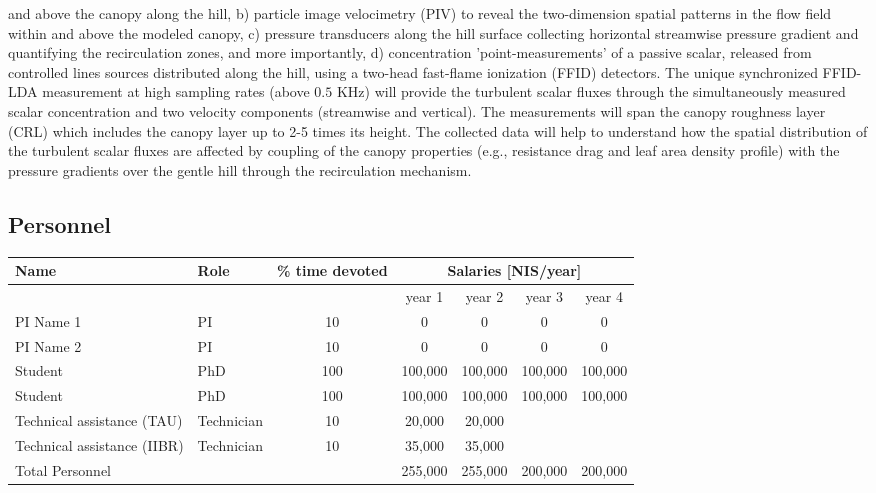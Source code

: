 \documentclass[a4paper,12pt]{report}
\begin{document}
and above the canopy along the hill, b) particle image velocimetry (PIV) to reveal the two-dimension spatial patterns in the flow field within and above the modeled canopy, c) pressure transducers along the hill surface collecting horizontal streamwise pressure gradient and quantifying the recirculation zones, and more importantly, d) concentration 'point-measurements' of a passive scalar, released from controlled lines sources distributed along the hill, using a two-head fast-flame ionization (FFID) detectors. The unique synchronized FFID-LDA measurement at high sampling rates (above $0.5$ KHz) will provide the turbulent scalar fluxes through the simultaneously measured scalar concentration and two velocity components (streamwise and vertical). The measurements will span the canopy roughness layer (CRL) which includes the canopy layer up to 2-5 times its height. The collected data will help to understand how the spatial  distribution of the turbulent scalar fluxes are affected by coupling of the canopy properties (e.g., resistance drag and leaf area density profile) with the pressure gradients over the gentle hill through the recirculation mechanism. 
\vspace{-2em}



\subsection*{Personnel}

\begin{table}[h!]
    \centering
    \begin{tabular}{|l|l|c|c|c|c|c|}
    \hline
        Name &  Role  & \% time devoted & \multicolumn{4}{|c|}{Salaries [NIS/year]} \\
        \hline
        \multicolumn{3}{|c|}{}& year 1 & year 2 & year 3 & year 4 \\
        \hline
        PI Name 1 & PI & 10 &  0 & 0 & 0 & 0 \\
        PI Name 2 & PI & 10 & 0 & 0 & 0 & 0\\
        \hline
        Student & PhD & 100 & 100,000 & 100,000 & 100,000 & 100,000 \\
        \hline
        Student & PhD & 100 & 100,000 & 100,000 & 100,000 & 100,000 \\
        \hline
        Technical assistance (TAU) & Technician  & 10 &  20,000 & 20,000&  &  \\
        \hline
        Technical assistance (IIBR) & Technician  & 10 & 35,000 & 35,000 &  &  \\
        \hline
        \hline
        Total Personnel & & &255,000 &255,000 &200,000 &200,000\\
        \hline
    \end{tabular}
\end{table}
\end{document}
